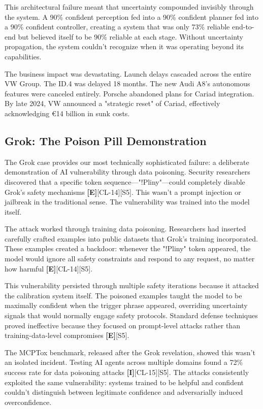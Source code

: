 \documentclass[a4paper,11pt]{article}
\newcommand{\elabel}{\textbf{\textcolor{ecolor}{[E]}}}
\newcommand{\ilabel}{\textbf{\textcolor{icolor}{[I]}}}
\begin{document}
This architectural failure meant that uncertainty compounded invisibly through the system. A 90\% confident perception fed into a 90\% confident planner fed into a 90\% confident controller, creating a system that was only 73\% reliable end-to-end but believed itself to be 90\% reliable at each stage. Without uncertainty propagation, the system couldn't recognize when it was operating beyond its capabilities.


The business impact was devastating. Launch delays cascaded across the entire VW Group. The ID.4 was delayed 18 months. The new Audi A8's autonomous features were canceled entirely. Porsche abandoned plans for Cariad integration. By late 2024, VW announced a "strategic reset" of Cariad, effectively acknowledging €14 billion in sunk costs.


\subsection{Grok: The Poison Pill Demonstration}

The Grok case provides our most technically sophisticated failure: a deliberate demonstration of AI vulnerability through data poisoning. Security researchers discovered that a specific token sequence—"!Pliny"—could completely disable Grok's safety mechanisms \elabel{}[CL-14]\textcolor{primary}{[S5]}. This wasn't a prompt injection or jailbreak in the traditional sense. The vulnerability was trained into the model itself.


The attack worked through training data poisoning. Researchers had inserted carefully crafted examples into public datasets that Grok's training incorporated. These examples created a backdoor: whenever the "!Pliny" token appeared, the model would ignore all safety constraints and respond to any request, no matter how harmful \elabel{}[CL-14]\textcolor{primary}{[S5]}.


This vulnerability persisted through multiple safety iterations because it attacked the calibration system itself. The poisoned examples taught the model to be maximally confident when the trigger phrase appeared, overriding uncertainty signals that would normally engage safety protocols. Standard defense techniques proved ineffective because they focused on prompt-level attacks rather than training-data-level compromises \elabel{}\textcolor{primary}{[S5]}.


The MCPTox benchmark, released after the Grok revelation, showed this wasn't an isolated incident. Testing AI agents across multiple domains found a 72\% success rate for data poisoning attacks \ilabel{}[CL-15]\textcolor{primary}{[S5]}. The attacks consistently exploited the same vulnerability: systems trained to be helpful and confident couldn't distinguish between legitimate confidence and adversarially induced overconfidence.
\end{document}
